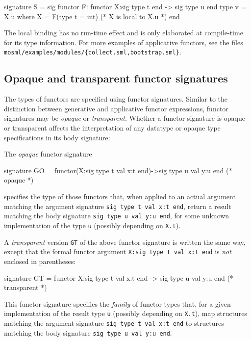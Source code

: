 \documentclass[fleqn,a4paper]{article}
\begin{document}
\begin{program}
signature S = sig functor F: functor X:sig type t end -> sig type u end
                  type v = X.u where X = F(type t = int)          (* X is local to X.u *)
              end
\end{program}

\noindent
The local binding has no run-time effect and is only elaborated at
compile-time for its type information.  For more examples of
applicative functors, see the files {\tt
  mosml/examples/modules/\{collect.sml,bootstrap.sml\}}.


\subsection{Opaque and transparent functor signatures}
\label{sec-functor-signatures}

The types of functors are specified using functor signatures. Similar
to the distinction between generative and applicative functor
expressions, functor signatures may be \emph{opaque} or
\emph{transparent}.  Whether a functor signature is opaque or
transparent affects the interpretation of any datatype or opaque type
specifications in its body signature:

The \emph{opaque} functor signature 
\begin{program}
signature GO = functor(X:sig type t val x:t end)->sig type u val y:u end   (* opaque      *)
\end{program}

\noindent
specifies the type of those functors that, when applied to an actual
argument matching the argument signature \texttt{sig type t val x:t end}, 
return a result matching the body signature \texttt{sig type u val y:u end}, 
for some unknown implementation of the type \texttt{u}
(possibly depending on \texttt{X.t}).


A \emph{transparent} version \texttt{GT} of the above functor
signature is written the same way, except that the formal functor
argument \texttt{X:sig type t val x:t end} is \emph{not} enclosed in
parentheses:
\begin{program}
signature GT = functor X:sig type t val x:t end -> sig type u val y:u end  (* transparent *)
\end{program}

\noindent
This functor signature
specifies the \emph{family} of functor types that, for a given 
implementation of the result type \texttt{u} (possibly 
depending on \texttt{X.t}),
map structures matching the argument signature
\texttt{sig type t val x:t  end} to structures
matching the body signature \texttt{sig type u val y:u end}.
\end{document}
